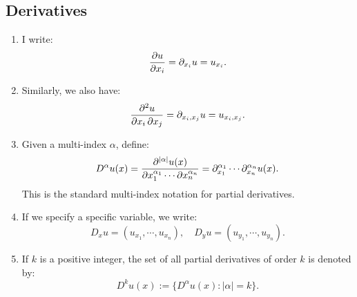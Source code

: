 \subsection{Derivatives}

\begin{enumerate}
  \item I write:
    \[%
      \pdv{u}{x_i} = \pd{x_i} u = u_{x_i}
    .\]%
  \item Similarly, we also have:
    \[%
      \pdv{u}{x_i,x_j} = \pd[style-var=single]{x_i,x_j} u = u_{x_i,x_j}
    .\]%
  \item Given a multi-index $\alpha$, define:
    \[%
      D^\alpha u(x) = \pdv[order={\alpha_1, \alpha_n}, mixed-order={|\alpha|}, sep-ord-inf={\cdots}]{u(x)}{x_1, x_n} = \pd[\alpha_1]{x_1} \cdots \pd[\alpha_n]{x_n} u(x)
    .\]%
    This is the standard multi-index notation for partial derivatives.
  \item If we specify a specific variable, we write:
    \[%
      D_xu = (u_{x_1}, \cdots, u_{x_n}), \quad D_yu = (u_{y_1}, \cdots, u_{y_n})
    .\]%
  \item If $k$ is a positive integer, the set of all partial derivatives of order $k$ is denoted by:
    \[%
      D^ku(x) := \{D^\alpha u(x) : |\alpha| = k\}
    .\]%
\end{enumerate}

